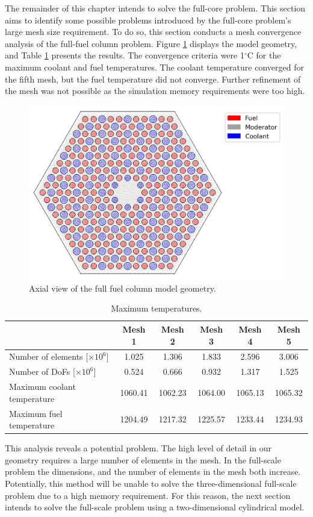 The remainder of this chapter intends to solve the full-core problem.
This section aims to identify some possible problems introduced by the full-core problem's large mesh size requirement.
To do so, this section conducts a mesh convergence analysis of the full-fuel column problem.
Figure \ref{fig:th-full-assem-mesh} displays the model geometry, and Table \ref{tab:th-full-assem-results} presents the results.
The convergence criteria were 1$^{\circ}$C for the maximum coolant and fuel temperatures.
The coolant temperature converged for the fifth mesh, but the fuel temperature did not converge.
Further refinement of the mesh was not possible as the simulation memory requirements were too high.

\begin{figure}[htbp!]
  \centering
  \includegraphics[width=0.45\linewidth]{figures-thermal/full-assem-mesh2}
  \hfill
  \caption{Axial view of the full fuel column model geometry.}
  \label{fig:th-full-assem-mesh}
\end{figure}

\begin{table}[htbp!]
  \centering
  \caption{Maximum temperatures.}
  \label{tab:th-full-assem-results}
\begin{tabular}{l|ccccc}
\toprule
                            & Mesh 1 & Mesh 2 & Mesh 3 & Mesh 4 & Mesh 5 \\
\midrule
Number of elements [$\times 10^{6}$]  & 1.025 & 1.306 & 1.833 & 2.596 & 3.006 \\
Number of DoFs [$\times 10^{6}$]      & 0.524 & 0.666 & 0.932 & 1.317 & 1.525 \\
Maximum coolant temperature & 1060.41 & 1062.23 & 1064.00 & 1065.13 & 1065.32 \\
Maximum fuel temperature    & 1204.49 & 1217.32 & 1225.57 & 1233.44 & 1234.93 \\
\bottomrule
\end{tabular}
\end{table}

This analysis reveals a potential problem.
The high level of detail in our geometry requires a large number of elements in the mesh.
In the full-scale problem the dimensions, and the number of elements in the mesh both increase.
Potentially, this method will be unable to solve the three-dimensional full-scale problem due to a high memory requirement.
For this reason, the next section intends to solve the full-scale problem using a two-dimensional cylindrical model.

